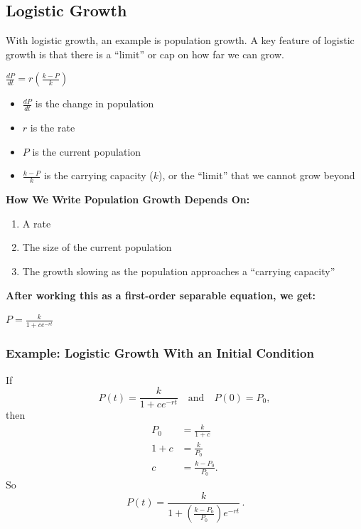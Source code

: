 \documentclass[11pt]{article}
\begin{document}
\subsection{Logistic Growth}

With logistic growth, an example is population growth. A key feature of logistic growth is that there is a ``limit''
or cap on how far we can grow.

\begin{center}
  $\frac{dP}{dt} = r\left(\frac{k - P}{k}\right)$
\end{center}

\begin{itemize}
  \item $\frac{dP}{dt}$ is the change in population
  \item $r$ is the rate
  \item $P$ is the current population
  \item $\frac{k - P}{k}$ is the carrying capacity ($k$), or the ``limit'' that we cannot grow beyond
\end{itemize}

\textbf{How We Write Population Growth Depends On:}
\begin{enumerate}
  \item A rate
  \item The size of the current population
  \item The growth slowing as the population approaches a ``carrying capacity''
\end{enumerate}

\textbf{After working this as a first-order separable equation, we get:}
\begin{center}
  \Large$P = \frac{k}{1 + ce^{-rt}}$
\end{center}

\subsubsection*{Example: Logistic Growth With an Initial Condition}
If
\[
P(t)=\frac{k}{1+ce^{-rt}}
\quad\text{and}\quad
P(0)=P_0,
\]
then
\begin{align*}
P_0 &= \frac{k}{1+c}\\
1+c &= \frac{k}{P_0}\\
c &= \frac{k-P_0}{P_0}.
\end{align*}
So
\[
\boxed{\,P(t)=\frac{k}{1+\left(\frac{k-P_0}{P_0}\right)e^{-rt}}\,}.
\]
\end{document}
